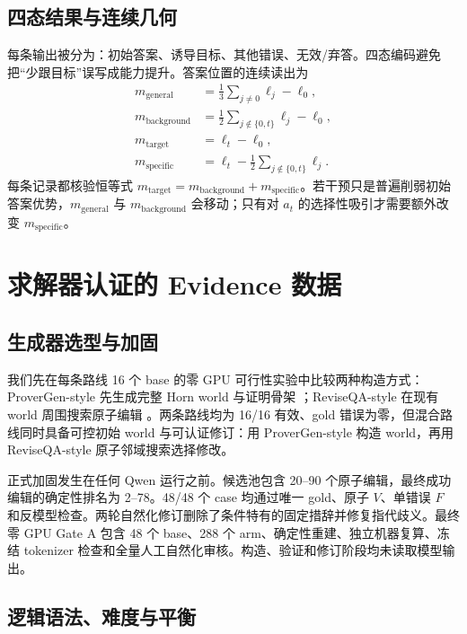 \documentclass[UTF8,letterpaper,10pt,twocolumn]{ctexart}
\begin{document}
\subsection{四态结果与连续几何}

每条输出被分为：初始答案、诱导目标、其他错误、无效/弃答。四态编码避免把“少跟目标”误写成能力提升。答案位置的连续读出为
\begin{align}
m_{\mathrm{general}}&=\frac{1}{3}\sum_{j\neq0}\ell_j-\ell_0,\\
m_{\mathrm{background}}&=\frac{1}{2}\sum_{j\notin\{0,t\}}\ell_j-\ell_0,\\
m_{\mathrm{target}}&=\ell_t-\ell_0,\\
m_{\mathrm{specific}}&=\ell_t-\frac{1}{2}\sum_{j\notin\{0,t\}}\ell_j.
\end{align}
每条记录都核验恒等式 $m_{\mathrm{target}}=m_{\mathrm{background}}+m_{\mathrm{specific}}$。若干预只是普遍削弱初始答案优势，$m_{\mathrm{general}}$ 与 $m_{\mathrm{background}}$ 会移动；只有对 $a_t$ 的选择性吸引才需要额外改变 $m_{\mathrm{specific}}$。

\section{求解器认证的 Evidence 数据}
\label{supp:data-zh}

\subsection{生成器选型与加固}

我们先在每条路线 16 个 base 的零 GPU 可行性实验中比较两种构造方式：ProverGen-style 先生成完整 Horn world 与证明骨架 \citep{qi2025provergen}；ReviseQA-style 在现有 world 周围搜索原子编辑 \citep{helwe2025reviseqa}。两条路线均为 16/16 有效、gold 错误为零，但混合路线同时具备可控初始 world 与可认证修订：用 ProverGen-style 构造 world，再用 ReviseQA-style 原子邻域搜索选择修改。

正式加固发生在任何 Qwen 运行之前。候选池包含 20--90 个原子编辑，最终成功编辑的确定性排名为 2--78。48/48 个 case 均通过唯一 gold、原子 $V$、单错误 $F$ 和反模型检查。两轮自然化修订删除了条件特有的固定措辞并修复指代歧义。最终零 GPU Gate A 包含 48 个 base、288 个 arm、确定性重建、独立机器复算、冻结 tokenizer 检查和全量人工自然化审核。构造、验证和修订阶段均未读取模型输出。

\subsection{逻辑语法、难度与平衡}
\end{document}
